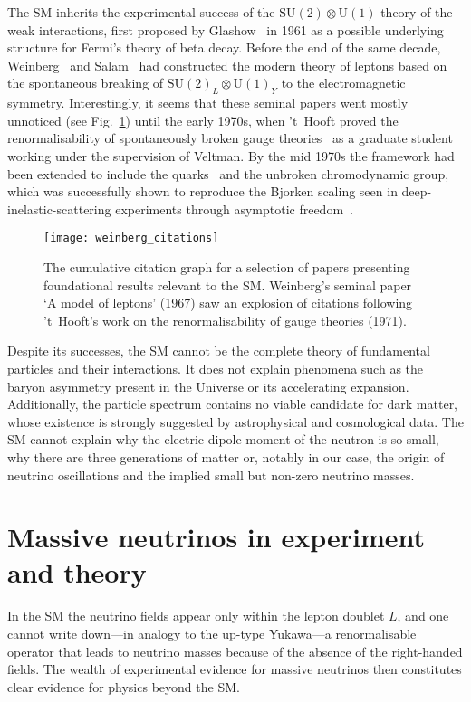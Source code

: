The SM inherits the experimental success of the
$\mathrm{SU}(2) \otimes \mathrm{U}(1)$ theory of the weak interactions, first
proposed by Glashow~\cite{Glashow:1961tr} in 1961 as a possible underlying
structure for Fermi's theory of beta decay. Before the end of the same decade,
Weinberg~\cite{Weinberg:1967tq} and Salam~\cite{Salam:1968rm} had constructed
the modern theory of leptons based on the spontaneous breaking of
$\mathrm{SU}(2)_{L} \otimes \mathrm{U}(1)_{Y}$ to the electromagnetic symmetry.
Interestingly, it seems that these seminal papers went mostly unnoticed (see
Fig.~\ref{fig:weinberg-citations}) until the early 1970s, when 't~Hooft proved
the renormalisability of spontaneously broken gauge
theories~\cite{tHooft:1971akt} as a graduate student working under the
supervision of Veltman. By the mid 1970s the framework had been extended to
include the quarks~\cite{Glashow:1970gm} and the unbroken chromodynamic group,
which was successfully shown to reproduce the Bjorken scaling seen in
deep-inelastic-scattering experiments through asymptotic
freedom~\cite{Gross:1973id}.
\begin{figure}[t]
  \centering
  \texttt{[image: weinberg\_citations]}
  \caption{The cumulative citation graph for a selection of papers presenting
    foundational results relevant to the SM. Weinberg's seminal paper `A model
    of leptons' (1967) saw an explosion of citations following 't~Hooft's work
    on the renormalisability of gauge theories (1971).}
  \label{fig:weinberg-citations}
\end{figure}

Despite its successes, the SM cannot be the complete theory of fundamental
particles and their interactions. It does not explain phenomena such as the
baryon asymmetry present in the Universe or its accelerating expansion.
Additionally, the particle spectrum contains no viable candidate for dark
matter, whose existence is strongly suggested by astrophysical and cosmological
data. The SM cannot explain why the electric dipole moment of the neutron is so
small, why there are three generations of matter or, notably in our case, the
origin of neutrino oscillations and the implied small but non-zero neutrino
masses.

\section{Massive neutrinos in experiment and theory}

In the SM the neutrino fields appear only within the lepton doublet $L$, and one
cannot write down---in analogy to the up-type Yukawa---a renormalisable operator
that leads to neutrino masses because of the absence of the right-handed fields.
The wealth of experimental evidence for massive neutrinos then constitutes clear
evidence for physics beyond the SM.

